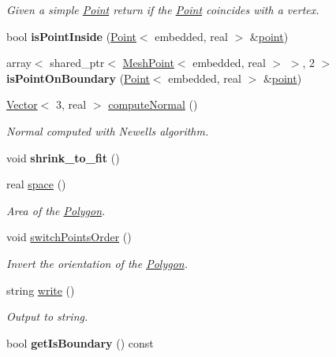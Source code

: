 \begin{DoxyCompactItemize}
\begin{DoxyCompactList}\small\item\em Given a simple \hyperlink{class_point}{Point} return if the \hyperlink{class_point}{Point} coincides with a vertex. \end{DoxyCompactList}\item 
bool {\bfseries is\+Point\+Inside} (\hyperlink{class_point}{Point}$<$ embedded, real $>$ \&\hyperlink{class_polygon_a56f83109c9c8ad214f41bd8036efb32c}{point})\hypertarget{class_polygon_a36fa14ce6d01941d406a04c795c2742d}{}\label{class_polygon_a36fa14ce6d01941d406a04c795c2742d}

\item 
array$<$ shared\+\_\+ptr$<$ \hyperlink{class_mesh_point}{Mesh\+Point}$<$ embedded, real $>$ $>$, 2 $>$ {\bfseries is\+Point\+On\+Boundary} (\hyperlink{class_point}{Point}$<$ embedded, real $>$ \&\hyperlink{class_polygon_a56f83109c9c8ad214f41bd8036efb32c}{point})\hypertarget{class_polygon_a6462af95446a3bd604146e10ff358860}{}\label{class_polygon_a6462af95446a3bd604146e10ff358860}

\item 
\hyperlink{class_point}{Vector}$<$ 3, real $>$ \hyperlink{class_polygon_aa12bdc3f0990036909241a3294ca90ae}{compute\+Normal} ()
\begin{DoxyCompactList}\small\item\em Normal computed with Newell\textquotesingle{}s algorithm. \end{DoxyCompactList}\item 
void {\bfseries shrink\+\_\+to\+\_\+fit} ()\hypertarget{class_polygon_af63fd7046132c422a90c52c3fc092cb3}{}\label{class_polygon_af63fd7046132c422a90c52c3fc092cb3}

\item 
real \hyperlink{class_polygon_ae119dd09d659fc1255fcfa1c45659a51}{space} ()
\begin{DoxyCompactList}\small\item\em Area of the \hyperlink{class_polygon}{Polygon}. \end{DoxyCompactList}\item 
void \hyperlink{class_polygon_aad5a195054aa08f073e59ea907bd5d60}{switch\+Points\+Order} ()\hypertarget{class_polygon_aad5a195054aa08f073e59ea907bd5d60}{}\label{class_polygon_aad5a195054aa08f073e59ea907bd5d60}

\begin{DoxyCompactList}\small\item\em Invert the orientation of the \hyperlink{class_polygon}{Polygon}. \end{DoxyCompactList}\item 
string \hyperlink{class_polygon_ac36032b05bfac321af17c5992de2deae}{write} ()
\begin{DoxyCompactList}\small\item\em Output to string. \end{DoxyCompactList}\item 
bool {\bfseries get\+Is\+Boundary} () const \hypertarget{class_polygon_a25bd0bca4495328793bdf0938bc26e1b}{}\label{class_polygon_a25bd0bca4495328793bdf0938bc26e1b}


\end{DoxyCompactItemize}
